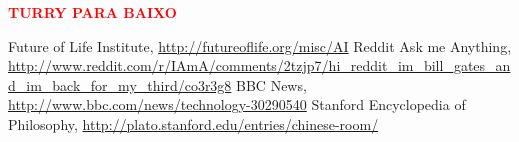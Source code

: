 \documentclass[runningheads,a4paper]{llncs}
\begin{document}
\textcolor{red}{\textbf{TURRY PARA BAIXO}}

\begin{thebibliography}{4}

   Future of Life Institute, \url{http://futureoflife.org/misc/AI}
   Reddit Ask me Anything, \url{http://www.reddit.com/r/IAmA/comments/2tzjp7/hi_reddit_im_bill_gates_and_im_back_for_my_third/co3r3g8}
   BBC News, \url{http://www.bbc.com/news/technology-30290540}
   Stanford Encyclopedia of Philosophy, \url{http://plato.stanford.edu/entries/chinese-room/}

\end{thebibliography}
\end{document}

